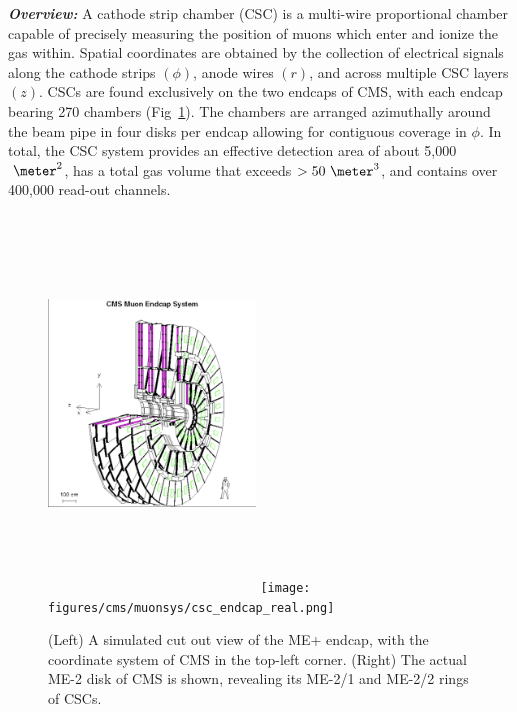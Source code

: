 \textit{\textbf{Overview:}}
A cathode strip chamber (CSC) is a multi-wire proportional chamber capable of precisely measuring the position of muons which enter and ionize the gas within.
Spatial coordinates are obtained by the collection of electrical signals along the cathode strips $(\phi)$, anode wires $(r)$, and across multiple CSC layers $(z)$.
CSCs are found exclusively on the two endcaps of CMS, with each endcap bearing 270 chambers (Fig~\ref{fig:cms_endcap}).
The chambers are arranged azimuthally around the beam pipe in four disks per endcap allowing for contiguous coverage in $\phi$.
In total, the CSC system provides an effective detection area of about 5,000$~\meter^2$, has a total gas volume that exceeds $>50~\meter^{3}$, and contains over 400,000 read-out channels.
\begin{figure}[pbth]
    \centering
    \includegraphics[width=0.49\textwidth,height=10cm,keepaspectratio]{figures/cms/muonsys/csc_endcap_cutaway.png}
    \texttt{[image: figures/cms/muonsys/csc\_endcap\_real.png]}
        \caption{
        (Left) A simulated cut out view of the ME+ endcap, with the coordinate system of CMS in the top-left corner.
        (Right) The actual ME-2 disk of CMS is shown, revealing its ME-2/1 and ME-2/2 rings of CSCs.
        }
    \label{fig:cms_endcap}
\end{figure}

